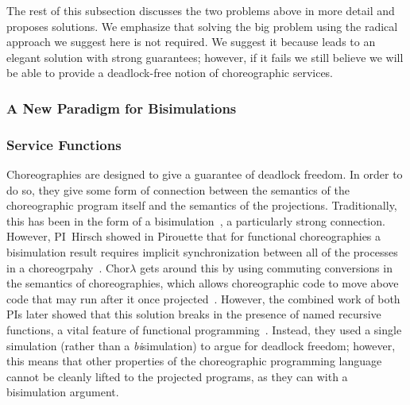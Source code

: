 The rest of this subsection discusses the two problems above in more detail and proposes solutions.
We emphasize that solving the big problem using the radical approach we suggest here is not required.
We suggest it because leads to an elegant solution with strong guarantees; however, if it fails we still believe we will be able to provide a deadlock-free notion of choreographic services.

\subsubsection{A New Paradigm for Bisimulations}
\label{sec:new-parad-bisim}



\subsubsection{Service Functions}
\label{sec:service-functions}


\iffalse
{}

Choreographies are designed to give a guarantee of deadlock freedom.
In order to do so, they give some form of connection between the semantics of the choreographic program itself and the semantics of the projections.
Traditionally, this has been in the form of a bisimulation~\cite{Montesi13,Cruz-FilipeM17,HirschG22,Montesi23}, a particularly strong connection.
However, PI~Hirsch showed in Pirouette that for functional choreographies a bisimulation result requires implicit synchronization between all of the processes in a choreogrpahy~\cite{HirschG22}.
Chor$\lambda$ gets around this by using commuting conversions in the semantics of choreographies, which allows choreographic code to move above code that may run after it once projected~\cite{CruzFilipeGLMP23,CruzFilipeGLMP22}.
However, the combined work of both PIs later showed that this solution breaks in the presence of named recursive functions, a vital feature of functional programming~\cite{SamuelsonHC25}.
Instead, they used a single simulation (rather than a \emph{bi}simulation) to argue for deadlock freedom; however, this means that other properties of the choreographic programming language cannot be cleanly lifted to the projected programs, as they can with a bisimulation argument.

